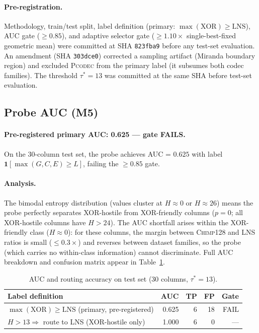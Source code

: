 \documentclass[sigconf]{acmart}
\newcommand{\chimp}{\textsc{Chimp128}\xspace}
\newcommand{\pcodec}{\textsc{Pcodec}\xspace}
\begin{document}
\paragraph{Pre-registration.}
Methodology, train/test split, label definition (primary: $\max(\text{XOR}) \geq
\text{LNS}$), AUC gate ($\geq 0.85$), and adaptive selector gate
($\geq 1.10\times$ single-best-fixed geometric mean) were committed at SHA
\texttt{823fba9} before any test-set evaluation.  An amendment (SHA
\texttt{303dce0}) corrected a sampling artifact (Miranda boundary region)
and excluded \pcodec from the primary label (it subsumes both codec
families).  The threshold $\tau^* = 13$ was committed at the same SHA
before test-set evaluation.

\subsection{Probe AUC (M5)}

\paragraph{Pre-registered primary AUC: 0.625 — gate FAILS.}
On the 30-column test set, the probe achieves AUC = $0.625$ with label
$\mathbf{1}[\max(G, C, E) \geq L]$, failing the $\geq 0.85$ gate.

\paragraph{Analysis.}
The bimodal entropy distribution (values cluster at $H \approx 0$ or
$H \approx 26$) means the probe perfectly separates XOR-hostile from
XOR-friendly columns ($p = 0$; all XOR-hostile columns have $H > 24$).
The AUC shortfall arises within the XOR-friendly class ($H \approx 0$):
for these columns, the margin between \chimp and LNS ratios is small
($\leq 0.3\times$) and reverses between dataset families, so the probe
(which carries no within-class information) cannot discriminate.  Full
AUC breakdown and confusion matrix appear in Table~\ref{tab:auc}.

\begin{table}[h]
\centering
\caption{AUC and routing accuracy on test set (30 columns, $\tau^* = 13$).}
\label{tab:auc}
\begin{tabular}{lrrrr}
\toprule
Label definition & AUC & TP & FP & Gate \\
\midrule
$\max(\text{XOR}) \geq \text{LNS}$ (primary, pre-registered) & 0.625 & 6 & 18 & FAIL \\
$H > 13 \Rightarrow$ route to LNS (XOR-hostile only) & 1.000 & 6 & 0 & --- \\
\bottomrule
\end{tabular}
\end{table}
\end{document}
